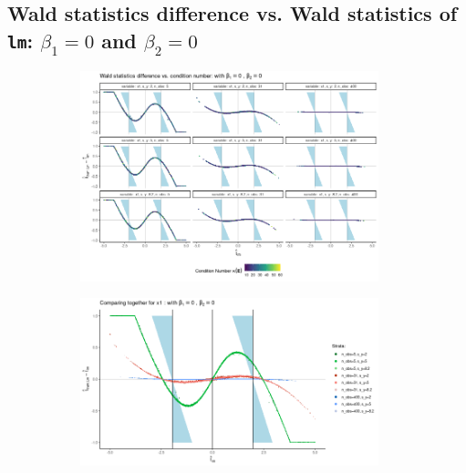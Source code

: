 \documentclass[11pt,a4paper,twoside]{book}\usepackage[]{graphicx}\usepackage[]{xcolor}
\begin{document}
\subsection{Wald statistics difference vs. Wald statistics of \texttt{lm}: $\beta_1=0$ and $\beta_2=0$}
\begin{figure}[H]
\begin{subfigure}[b]{1\textwidth}
\vspace*{-0.5cm}
\centering
\includegraphics[width=0.95\textwidth]{../fromsim/simdiffvswald411-1.png}
\end{subfigure}
\begin{subfigure}[b]{1\textwidth}
\vspace*{-0.3cm}
\centering
\includegraphics[width=0.95\textwidth]{../fromsim/simdiffvswald412-1.png}
\end{subfigure}
\vspace*{-0.9cm}

\end{figure}
\end{document}
